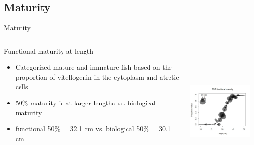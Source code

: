 \documentclass[pdf]{beamer}\usepackage[]{graphicx}\usepackage[]{color}
\begin{document}
\subsection{Maturity}
\begin{frame}{Maturity}
\begin{columns}
  \begin{column}{0.5\textwidth}
      Functional maturity-at-length
      \begin{itemize}
        \item Categorized mature and immature fish based on the proportion of vitellogenin in the cytoplasm and atretic cells
        \item 50\% maturity is at larger lengths vs. biological maturity
        \item functional 50\% = 32.1 cm vs. biological 50\% = 30.1 cm
      \end{itemize}
  \end{column}
  
  \begin{column}{0.5\textwidth}
  \begin{center}
    \includegraphics[height = 2.75in, width = 2.5in]{figures/Functional_Maturity.png}
  \end{center}
  \end{column}
\end{columns}
\end{frame}
\end{document}
